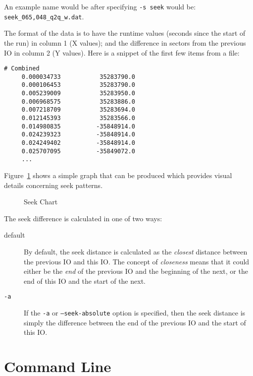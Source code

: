 \documentclass{article}
\begin{document}
  An example name would be after specifying \texttt{-s seek} would be:
  \texttt{seek\_065,048\_q2q\_w.dat}.

  The format of the data is to have the runtime values (seconds since
  the start of the run) in column 1 (X values); and the difference in
  sectors from the previous IO in column 2 (Y values). Here is a snippet
  of the first few items from a file:

\begin{verbatim}
# Combined
     0.000034733           35283790.0
     0.000106453           35283790.0
     0.005239009           35283950.0
     0.006968575           35283886.0
     0.007218709           35283694.0
     0.012145393           35283566.0
     0.014980835          -35848914.0
     0.024239323          -35848914.0
     0.024249402          -35848914.0
     0.025707095          -35849072.0
     ...
\end{verbatim}

  Figure~\ref{fig:seek} shows a simple graph that can be produced which
  provides visual details concerning seek patterns.

  \begin{figure}[h!]
  \leavevmode\centering
  \caption{\label{fig:seek}Seek Chart}
  \end{figure}
  \FloatBarrier

  The seek difference is calculated in one of two ways:

  \begin{description}
    \item[default] By default, the seek distance is calculated as the
    \emph{closest} distance between the previous IO and this IO. The
    concept of \emph{closeness} means that it could either be the
    \emph{end} of the previous IO and the beginning of the next, or the
    end of this IO and the start of the next.

    \item[\texttt{-a}] If the \texttt{-a} or \texttt{--seek-absolute}
    option is specified, then the seek distance is simply the difference
    between the end of the previous IO and the start of this IO.
  \end{description}

\newpage\section{\label{sec:cmd-line}Command Line}
\end{document}
